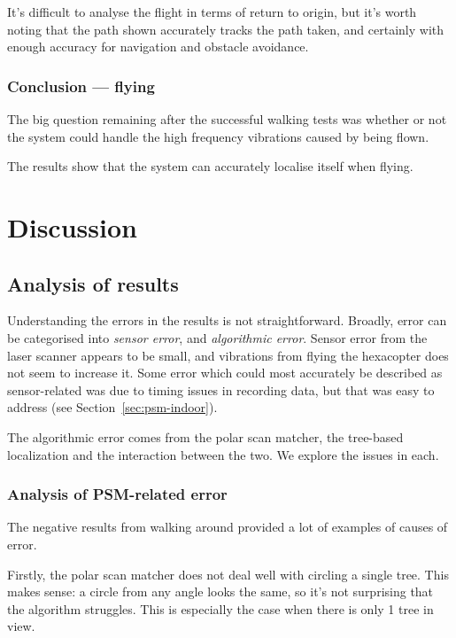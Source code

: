 \documentclass[12pt,oneside,a4paper]{book}
\begin{document}
It's difficult to analyse the flight in terms of return to origin, but
it's worth noting that the path shown accurately tracks the path
taken, and certainly with enough accuracy for navigation and obstacle
avoidance.
\newpage
\subsection{Conclusion --- flying}
\label{sec:conclusion-flying}

The big question remaining after the successful walking tests was
whether or not the system could handle the high frequency vibrations
caused by being flown. 

The results show that the system can accurately localise itself when
flying. 

\chapter{Discussion}
\label{cha:discussion}

\section{Analysis of results}
\label{sec:analysis-results}

Understanding the errors in the results is not
straightforward. Broadly, error can be categorised into \emph{sensor
  error}, and \emph{algorithmic error}. Sensor error from the laser
scanner appears to be small, and vibrations from flying the hexacopter
does not seem to increase it. Some error which could most accurately
be described as sensor-related was due to timing issues in recording
data, but that was easy to address (see Section~\ref{sec:psm-indoor}).

The algorithmic error comes from the polar scan matcher, the
tree-based localization and the interaction between the two. We
explore the issues in each.

\subsection{Analysis of PSM-related error}
\label{sec:psm-error}

The negative results from walking around provided a lot of examples of
causes of error.

Firstly, the polar scan matcher does not deal well with circling a
single tree. This makes sense: a circle from any angle looks the same,
so it's not surprising that the algorithm struggles. This is
especially the case when there is only 1 tree in view.
\end{document}
